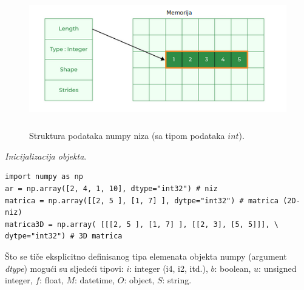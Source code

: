 \begin{figure}%
	\centering
	\includegraphics[width=320pt,height=170pt]{slike/numpy-array-memory.png} %

	\caption{Struktura podataka numpy niza (sa tipom podataka $int$).\protect \footnotemark}	 \label{fig:numpy_array}
 
\end{figure} 

\textit{Inicijalizacija objekta}. 
\begin{verbatim}
import numpy as np
ar = np.array([2, 4, 1, 10], dtype="int32") # niz
matrica = np.array([[2, 5 ], [1, 7] ], dytpe="int32") # matrica (2D-niz)
matrica3D = np.array( [[[2, 5 ], [1, 7] ], [[2, 3], [5, 5]]], \ 
dytpe="int32") # 3D matrica
\end{verbatim}
 
Što se tiče eksplicitno definisanog tipa elemenata objekta numpy (argument \emph{dtype}) mogući su sljedeći tipovi:  $i$: integer (i4, i2, itd.),  $b$: boolean, $u$: unsigned integer, $f$: float,  $M$: datetime, $O$: object, $S$: string. 

